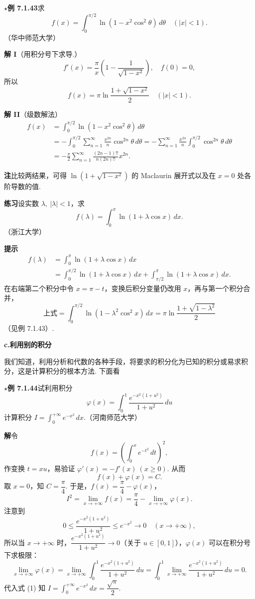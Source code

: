 \documentclass[UTF8,12pt,a4paper,fontset=fandol]{ctexart}
\begin{document}
\noindent\textbf{$\star$例 7.1.43}\quad 求
\[
f(x)=\int_0^{\pi/2}\ln(1-x^2\cos^2\theta)\,d\theta\quad(|x|<1).
\]
（华中师范大学）

\noindent\textbf{解 I}\quad （用积分号下求导.）
\[
f'(x)=\frac{\pi}{x}\left(1-\frac1{\sqrt{1-x^2}}\right),\quad f(0)=0,
\]
所以
\[
f(x)=\pi\ln\frac{1+\sqrt{1-x^2}}2\quad(|x|<1).
\]

\noindent\textbf{解 II}\quad （级数解法）
\[
\begin{aligned}
f(x)
&=\int_0^{\pi/2}\ln(1-x^2\cos^2\theta)\,d\theta\\
&=-\int_0^{\pi/2}\sum_{n=1}^{\infty}\frac{x^{2n}}n\cos^{2n}\theta\,d\theta
=-\sum_{n=1}^{\infty}\frac{x^{2n}}n\int_0^{\pi/2}\cos^{2n}\theta\,d\theta\\
&=-\frac{\pi}{2}\sum_{n=1}^{\infty}\frac{(2n-1)!!}{n(2n)!!}x^{2n}.
\end{aligned}
\]

\noindent\textbf{注}\quad 比较两结果，可得 $\ln(1+\sqrt{1-x^2})$ 的 Maclaurin 展开式以及在 $x=0$ 处各阶导数的值.

\noindent\textbf{练习}\quad 设实数 $\lambda,\ |\lambda|<1$，求
\[
f(\lambda)=\int_0^\pi\ln(1+\lambda\cos x)\,dx.
\]
（浙江大学）

\noindent\textbf{提示}\quad
\[
\begin{aligned}
f(\lambda)
&=\int_0^\pi\ln(1+\lambda\cos x)\,dx\\
&=\int_0^{\pi/2}\ln(1+\lambda\cos x)\,dx
+\int_{\pi/2}^{\pi}\ln(1+\lambda\cos x)\,dx.
\end{aligned}
\]
在右端第二个积分中令 $x=\pi-t$，变换后积分变量仍改用 $x$，再与第一个积分合并，
\[
\text{上式}=\int_0^{\pi/2}\ln(1-\lambda^2\cos^2x)\,dx
=\pi\ln\frac{1+\sqrt{1-\lambda^2}}2
\]
（见例 7.1.43）.

\noindent\textbf{c.\quad 利用别的积分}

我们知道，利用分析和代数的各种手段，将要求的积分化为已知的积分或易求积分，这是计算积分的根本方法. 下面看

\noindent\textbf{$\star$例 7.1.44}\quad 试利用积分
\[
\varphi(x)=\int_0^1\frac{e^{-x^2(1+u^2)}}{1+u^2}\,du
\]
计算积分 $I=\displaystyle\int_0^{+\infty}e^{-x^2}\,dx$.（河南师范大学）

\noindent\textbf{解}\quad 令
\[
f(x)=\left(\int_0^xe^{-t^2}\,dt\right)^2,
\]
作变换 $t=xu$，易验证 $\varphi'(x)=-f'(x)\ (x\ge0)$. 从而
\[
f(x)+\varphi(x)=C.
\]
取 $x=0$，知 $C=\dfrac{\pi}{4}$. 于是，$f(x)=\dfrac{\pi}{4}-\varphi(x)$，
\[
I^2=\lim_{x\to+\infty}f(x)=\frac{\pi}{4}-\lim_{x\to+\infty}\varphi(x).
\tag{1}
\]
注意到
\[
0\le\frac{e^{-x^2(1+u^2)}}{1+u^2}\le e^{-x^2}\to0\quad(x\to+\infty),
\]
所以当 $x\to+\infty$ 时，$\dfrac{e^{-x^2(1+u^2)}}{1+u^2}\to0$（关于 $u\in[0,1]$），$\varphi(x)$ 可以在积分号下求极限：
\[
\lim_{x\to+\infty}\varphi(x)
=\lim_{x\to+\infty}\int_0^1\frac{e^{-x^2(1+u^2)}}{1+u^2}\,du
=\int_0^1\lim_{x\to+\infty}\frac{e^{-x^2(1+u^2)}}{1+u^2}\,du=0.
\]
代入式 (1) 知 $I=\displaystyle\int_0^{+\infty}e^{-x^2}\,dx=\dfrac{\sqrt\pi}{2}$.
\end{document}
